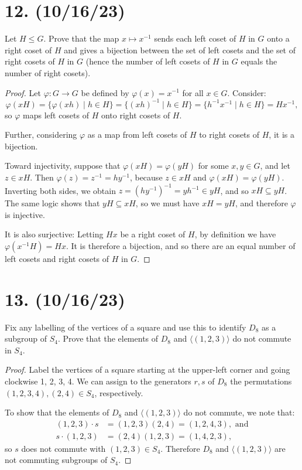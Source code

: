 \documentclass{article}
\begin{document}
\section*{12. (10/16/23)}

Let $H \leq G$. Prove that the map $x \mapsto x^{-1}$ sends each left coset of $H$ in $G$ onto a right coset of $H$ and gives a bijection between the set of left cosets and the set of right cosets of $H$ in $G$ (hence the number of left cosets of $H$ in $G$ equals the number of right cosets).

\begin{proof}
    Let $\varphi: G \rightarrow G$ be defined by $\varphi(x) = x^{-1}$ for all $x \in G$. Consider:
    \begin{equation*}
        \varphi(xH) = \{ \varphi(xh) \mid h \in H \} = \{ (xh)^{-1} \mid h \in H \} = \{ h^{-1} x^{-1} \mid h \in H \} = Hx^{-1},
    \end{equation*}
    so $\varphi$ maps left cosets of $H$ onto right cosets of $H$.

    Further, considering $\varphi$ as a map from left cosets of $H$ to right cosets of $H$, it is a bijection.
    
    Toward injectivity, suppose that $\varphi(xH) = \varphi(yH)$ for some $x, y \in G$, and let $z \in xH$. Then $\varphi(z) = z^{-1} = hy^{-1}$, because $z \in xH$ and $\varphi(xH) = \varphi(yH)$. Inverting both sides, we obtain $z = (hy^{-1})^{-1} = yh^{-1} \in yH$, and so $xH \subseteq yH$. The same logic shows that $yH \subseteq xH$, so we must have $xH = yH$, and therefore $\varphi$ is injective.

    It is also surjective: Letting $Hx$ be a right coset of $H$, by definition we have $\varphi(x^{-1}H) = Hx$. It is therefore a bijection, and so there are an equal number of left cosets and right cosets of $H$ in $G$. 
\end{proof}

\section*{13. (10/16/23)}

Fix any labelling of the vertices of a square and use this to identify $D_8$ as a subgroup of $S_4$. Prove that the elements of $D_8$ and $\langle (1, 2, 3) \rangle$ do not commute in $S_4$.

\begin{proof}
    Label the vertices of a square starting at the upper-left corner and going clockwise 1, 2, 3, 4. We can assign to the generators $r, s$ of $D_8$ the permutations $(1, 2, 3, 4), (2, 4) \in S_4$, respectively.

    To show that the elements of $D_8$ and $\langle (1, 2, 3) \rangle$ do not commute, we note that:
    \begin{align*}
        (1, 2, 3) \cdot s &= (1, 2, 3)(2, 4) = (1, 2, 4, 3), \text{ and} \\
        s \cdot (1, 2, 3) &= (2, 4)(1, 2, 3) = (1, 4, 2, 3),
    \end{align*}
    so $s$ does not commute with $(1, 2, 3) \in S_4$. Therefore $D_8$ and $\langle (1, 2, 3) \rangle$ are not commuting subgroups of $S_4$.
\end{proof}
\end{document}
